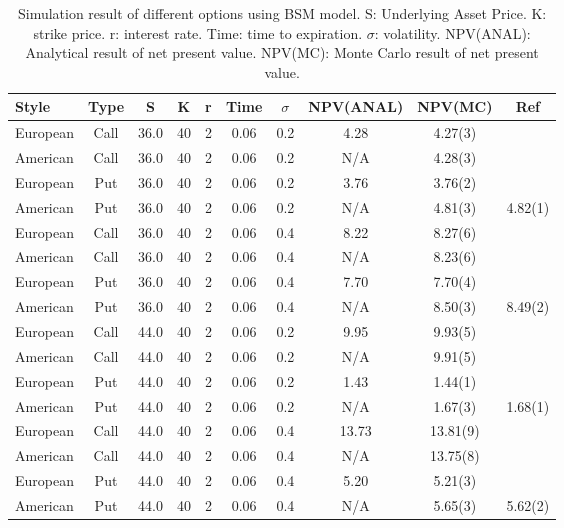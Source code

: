 \documentclass[a4paper]{article}
\begin{document}
\begin{table}
	\begin{tabular} { l  c  c   c  c  c   c    c       c        c  }
		Style 	 & Type & S  & K & r & Time &$\sigma$ & NPV(ANAL) & NPV(MC) &Ref\cite{americanoption}\\
	\hline 
		European & Call & 36.0 & 40 &2 & 0.06 & 0.2 & 4.28 & 4.27(3) & \\
		American & Call & 36.0 & 40 &2 & 0.06 & 0.2 & N/A  & 4.28(3) &\\
		European & Put  & 36.0 & 40 &2 & 0.06 & 0.2 & 3.76 & 3.76(2) &\\
		American & Put  & 36.0 & 40 &2 & 0.06 & 0.2 & N/A  & 4.81(3) & 4.82(1)\\
		European & Call & 36.0 & 40 &2 & 0.06 & 0.4 & 8.22 & 8.27(6) &\\
		American & Call & 36.0 & 40 &2 & 0.06 & 0.4 & N/A  & 8.23(6) &\\
		European & Put  & 36.0 & 40 &2 & 0.06 & 0.4 & 7.70 & 7.70(4) &\\
		American & Put  & 36.0 & 40 &2 & 0.06 & 0.4 & N/A  & 8.50(3) & 8.49(2)\\
		European & Call & 44.0 & 40 &2 & 0.06 & 0.2 & 9.95 & 9.93(5) &\\
		American & Call & 44.0 & 40 &2 & 0.06 & 0.2 & N/A  & 9.91(5) &\\
		European & Put  & 44.0 & 40 &2 & 0.06 & 0.2 & 1.43 & 1.44(1) &\\
		American & Put  & 44.0 & 40 &2 & 0.06 & 0.2 & N/A  & 1.67(3) & 1.68(1)\\
		European & Call & 44.0 & 40 &2 & 0.06 & 0.4 & 13.73 & 13.81(9) &\\
		American & Call & 44.0 & 40 &2 & 0.06 & 0.4 & N/A  & 13.75(8) &\\
		European & Put  & 44.0 & 40 &2 & 0.06 & 0.4 & 5.20 &  5.21(3)&\\
		American & Put  & 44.0 & 40 &2 & 0.06 & 0.4 & N/A  &  5.65(3)& 5.62(2)\\
	\hline
	\end{tabular}\\
\caption{Simulation result of different options using BSM model.
	S: Underlying Asset Price. K: strike price. r: interest rate. Time: time to expiration.
	$\sigma$: volatility. NPV(ANAL): Analytical result of net present value.
	NPV(MC): Monte Carlo result of net present value.}\label{option_bsm}
\end{table}
\end{document}
